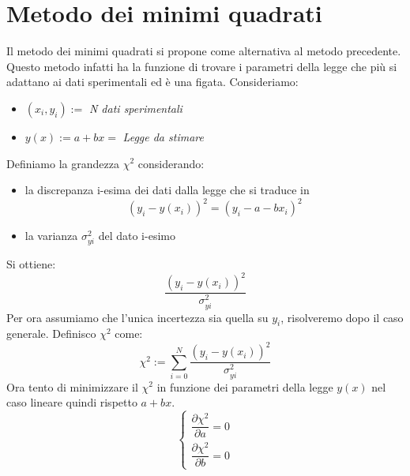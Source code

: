 \documentclass[11pt,a4paper]{book}
\begin{document}
\section{Metodo dei minimi quadrati} 
Il metodo dei minimi quadrati si propone come alternativa al metodo precedente. Questo metodo infatti ha la funzione di trovare i parametri della legge che più si adattano ai dati sperimentali ed è una figata. Consideriamo:
\begin{itemize}
\item $ (x_i,y_i) :=$ \textit{N dati sperimentali}
\item $ y(x) :=a+bx =$ \textit{Legge da stimare}
\end{itemize}
Definiamo la grandezza $ \chi^2 $ considerando:
\begin{itemize}
\item la discrepanza i-esima dei dati dalla legge che si traduce in
\begin{equation}
\left( y_i - y\left( x_i\right)  \right)^2 = \left( y_i -a -bx_i \right)^2 
\end{equation}
\item la varianza $ \sigma^2_{yi} $ del dato i-esimo
\end{itemize}
Si ottiene:
\begin{equation}
\frac{\left(y_i -y(x_i) \right)^2 }{\sigma_{yi}^2}
\end{equation}
Per ora assumiamo che l'unica incertezza sia quella su $ y_i $, risolveremo dopo il caso generale.
Definisco $ \chi^2 $ come: 
\begin{equation}
\chi^2 := \sum\limits_{i = 0}^{N} \frac{\left( y_i - y(x_i) \right)^2 }{\sigma_{yi}^2}
\end{equation}
Ora tento di minimizzare il $ \chi^2 $ in funzione dei parametri della legge $ y(x) $ nel caso lineare quindi rispetto $ a +bx $.
\begin{equation} 
\left\{
\begin{aligned}
\dfrac{\partial \chi^2}{\partial a} = 0\\
\dfrac{\partial \chi^2}{\partial b} = 0
\end{aligned}
\right.
\end{equation} 
\end{document}
